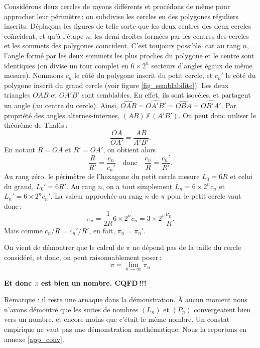 	Considérons deux cercles de rayons différents et procédons de même pour approcher leur périmètre\,: on subdivise les cercles en des polygones réguliers inscrits. Déplaçons les figures de telle sorte que les deux centres des deux cercles coïncident, et qu'à l'étape $n$, les demi-droites formées par les centres des cercles et les sommets des polygones coïncident. C'est toujours possible, car au rang $n$, l'angle formé par les deux sommets les plus proches du polygone et le centre sont identiques (on divise un tour complet en $6\times 2^n$ secteurs d'angles égaux de même mesure). Nommons $c_n$ le côté du polygone inscrit du petit cercle, et $c_n'$ le côté du polygone inscrit du grand cercle (voir figure \ref{fig_semblabilite}). Les deux triangles $OAB$ et $OA'B'$ sont semblables. En effet, ils sont isocèles, et partagent un angle (au centre du cercle). Ainsi, $\widehat{OAB}=\widehat{OA'B'}=\widehat{OBA}=\widehat{OB'A'}$. Par propriété des angles alternes-internes, $(AB)\sslash(A'B')$. On peut donc utiliser le théorème de Thalès\,:
	\begin{equation}
		\frac{OA}{OA'}=\frac{AB}{A'B'}. \nonumber	
	\end{equation}
	En notant $R=OA$ et $R'=OA'$, on obtient alors
	\begin{equation}
		\frac{R}{R'}=\frac{c_n}{c_n'}\quad\text{donc}\quad \frac{c_n}{R}=\frac{c_n'}{R'}. \nonumber
	\end{equation}
	Au rang zéro, le périmètre de l'hexagone du petit cercle mesure $L_0=6R$ et celui du grand, $L_0'=6R'$. Au rang $n$, on a tout simplement $L_n=6\times 2^n c_n $ et $L_n'=6\times 2^n c_n' $.
	La valeur approchée au rang $n$ de $\pi$ pour le petit cercle vaut donc\,:
	\begin{equation}
		\pi_n=\frac{1}{2R}6\times 2^n c_n = 3\times 2^n \frac{c_n}{R}.\nonumber
	\end{equation}
	Mais comme $c_n/R=c_n'/R'$, en fait, $\pi_n=\pi_n'$. 

	On vient de démontrer que le calcul de $\pi$ ne dépend pas de la taille du cercle considéré, et donc, on peut raisonnablement poser\,:
	\begin{equation}
		\pi=\lim\limits_{n\to\infty}\pi_n \nonumber
	\end{equation}

	{\bfseries Et donc $\pi$ est bien un nombre. CQFD\,!!!}

	Remarque : il reste une arnaque dans la démonstration. À aucun moment nous n'avons démontré que les suites de nombres $(L_n)$ et $(P_n)$ convergeaient bien vers un nombre, et encore moins que c'était le même nombre. Un constat empirique ne vaut pas une démonstration mathématique. Nous la reportons en annexe \ref{app_conv}. 

